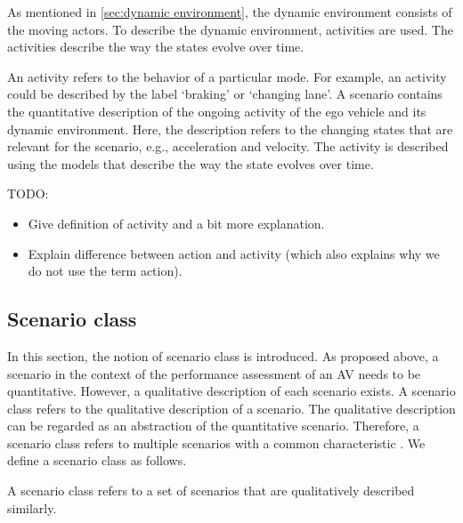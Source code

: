 As mentioned in \cref{sec:dynamic environment}, the dynamic environment consists of the moving actors. To describe the dynamic environment, activities are used. The activities describe the way the states evolve over time. 

An activity refers to the behavior of a particular mode. For example, an activity could be described by the label `braking' or `changing lane'.
A scenario contains the quantitative description of the ongoing activity of the ego vehicle and its dynamic environment. Here, the description refers to the changing states that are relevant for the scenario, e.g., acceleration and velocity. The activity is described using the models that describe the way the state evolves over time.

\color{red}
TODO:
\begin{itemize}
	\item Give definition of activity and a bit more explanation.
	\item Explain difference between action and activity (which also explains why we do not use the term action).
\end{itemize}
\color{black}

\cbend

\subsection{Scenario class}
\label{sec:scenario class}

In this section, the notion of scenario class is introduced. As proposed above, a scenario in the context of the performance assessment of an AV needs to be quantitative. However, a qualitative description of each scenario exists. 
A scenario class refers to the qualitative description of a scenario.
The qualitative description can be regarded as an abstraction of the quantitative scenario. Therefore, a scenario class refers to multiple scenarios with a common characteristic \cite{elrofai2018scenario}.
\cbstart
We define a scenario class as follows.
\begin{definition} \label{def:scenario class}
	A scenario class refers to a set of scenarios that are qualitatively described similarly.
\end{definition}
\cbend


